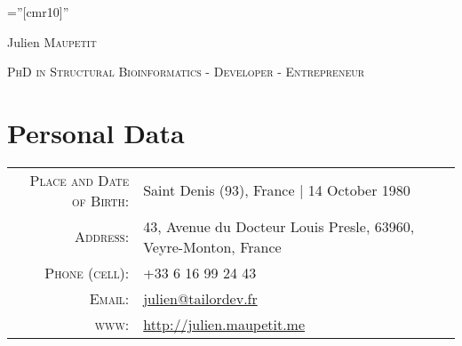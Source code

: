 \documentclass[a4paper,10pt]{article}
\begin{document}

\thispagestyle{empty} %

\font\fb=''[cmr10]'' %

\par{\centering
		{\Huge Julien \textsc{Maupetit}
	}\bigskip\par}
\par{\centering
		{\textsc{PhD in Structural Bioinformatics - Developer - Entrepreneur}
	}\bigskip\par}

\section{Personal Data}

\begin{tabular}{rl}
    \textsc{Place and Date of Birth:} & Saint Denis (93), France  | 14 October 1980 \\
    \textsc{Address:}   & 43, Avenue du Docteur Louis Presle, 63960, Veyre-Monton, France \\
    \textsc{Phone (cell):}     & +33 6 16 99 24 43\\
    \textsc{Email:}     & \href{mailto:julien@tailordev.fr}{julien@tailordev.fr}\\
    \textsc{www:}       & \href{http://julien.maupetit.me}{http://julien.maupetit.me}\\
\end{tabular}


\end{document}
